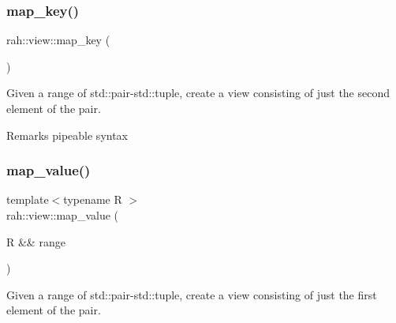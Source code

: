 \subsubsection{\texorpdfstring{map\_key()}{map\_key()}\hspace{0.1cm}{\footnotesize\ttfamily [2/2]}}
{\footnotesize\ttfamily rah\+::view\+::map\+\_\+key (\begin{DoxyParamCaption}{ }\end{DoxyParamCaption})}



Given a range of std\+::pair-\/std\+::tuple, create a view consisting of just the second element of the pair. 


\begin{DoxyCodeInclude}{0}
\end{DoxyCodeInclude}
\begin{DoxyRemark}{Remarks}
pipeable syntax 
\end{DoxyRemark}
\mbox{\label{namespacerah_1_1view_abde9f999ff37f8b31f7a25598f2b4a25}} 
\subsubsection{\texorpdfstring{map\_value()}{map\_value()}\hspace{0.1cm}{\footnotesize\ttfamily [1/2]}}
{\footnotesize\ttfamily template$<$typename R $>$ \\
rah\+::view\+::map\+\_\+value (\begin{DoxyParamCaption}\item[{R \&\&}]{range }\end{DoxyParamCaption})}



Given a range of std\+::pair-\/std\+::tuple, create a view consisting of just the first element of the pair. 


